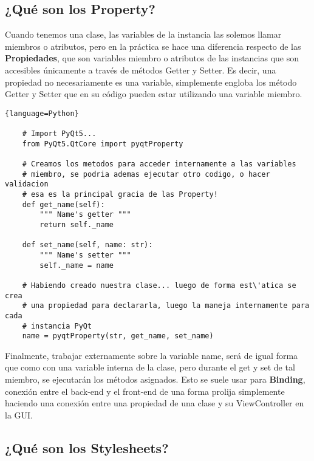 \subsection{¿Qu\'e son los Property?}
\label{qt_properties}
Cuando tenemos una clase, las variables de la instancia las solemos llamar miembros o atributos, pero en la pr\'actica se hace una diferencia
respecto de las \textbf{Propiedades}, que son variables miembro o atributos de las instancias que son accesibles \'unicamente a trav\'es de m\'etodos
Getter y Setter. Es decir, una propiedad no necesariamente es una variable, simplemente engloba los m\'etodo Getter y Setter que en su c\'odigo pueden estar
utilizando una variable miembro.

\begin{lstlisting}{language=Python}

    # Import PyQt5...
    from PyQt5.QtCore import pyqtProperty

    # Creamos los metodos para acceder internamente a las variables
    # miembro, se podria ademas ejecutar otro codigo, o hacer validacion
    # esa es la principal gracia de las Property!
    def get_name(self):
        """ Name's getter """
        return self._name
    
    def set_name(self, name: str):
        """ Name's setter """
        self._name = name

    # Habiendo creado nuestra clase... luego de forma est\'atica se crea
    # una propiedad para declararla, luego la maneja internamente para cada
    # instancia PyQt
    name = pyqtProperty(str, get_name, set_name)

\end{lstlisting}

Finalmente, trabajar externamente sobre la variable name, ser\'a de igual forma que como con una variable
interna de la clase, pero durante el get y set de tal miembro, se ejecutar\'an los m\'etodos asignados. Esto
se suele usar para \textbf{Binding}, conexi\'on entre el back-end y el front-end de una forma prolija simplemente
haciendo una conexi\'on entre una propiedad de una clase y su ViewController en la GUI.

\subsection{¿Qu\'e son los Stylesheets?}
\label{qt_stylesheets}

